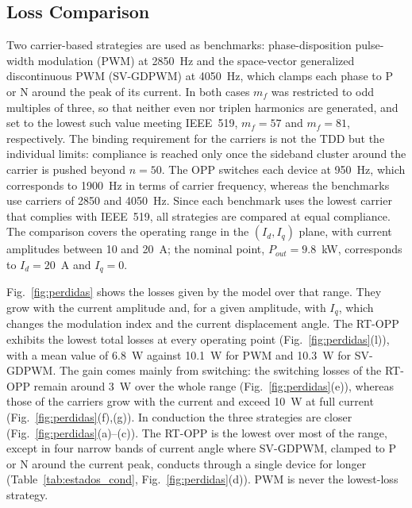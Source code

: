 \documentclass[conference]{IEEEtran}
\begin{document}
\subsection{Loss Comparison}

Two carrier-based strategies are used as benchmarks: phase-disposition
pulse-width modulation (PWM) at 2850~Hz and the space-vector generalized discontinuous PWM
(SV-GDPWM) \cite{hava_gdpwm} at 4050~Hz, which clamps each phase to P or N
around the peak of its current. In both cases $m_f$ was restricted to odd
multiples of three, so that neither even nor triplen harmonics are
generated, and set to the lowest such value meeting IEEE~519, $m_f = 57$
and $m_f = 81$, respectively. The binding requirement for the carriers is
not the TDD but the individual limits: compliance is reached only once the
sideband cluster around the carrier is pushed beyond $n = 50$. The OPP
switches each device at 950~Hz, which corresponds to 1900~Hz in terms of
carrier frequency, whereas the benchmarks use carriers of 2850 and
4050~Hz. Since each benchmark uses the lowest carrier that complies with
IEEE~519, all strategies are compared at equal compliance. The
comparison covers the operating range in the $(I_d,I_q)$ plane, with
current amplitudes between 10 and 20~A; the nominal point,
$P_{out} = 9.8$~kW, corresponds to $I_d = 20$~A and $I_q = 0$.

Fig.~\ref{fig:perdidas} shows the losses given by the model over that
range. They grow with the current amplitude and, for a given amplitude,
with $I_q$, which changes the modulation index and the current
displacement angle. The RT-OPP
exhibits the lowest total losses at every operating point
(Fig.~\ref{fig:perdidas}(l)), with a mean value of 6.8~W against 10.1~W for
PWM and 10.3~W for SV-GDPWM. The gain comes mainly from switching: the
switching losses of the RT-OPP remain around 3~W over the whole range
(Fig.~\ref{fig:perdidas}(e)), whereas those of the carriers grow with the
current and exceed 10~W at full current (Fig.~\ref{fig:perdidas}(f),(g)).
In conduction the three strategies are closer
(Fig.~\ref{fig:perdidas}(a)--(c)). The RT-OPP is the lowest over most of the
range, except in four narrow bands of current angle where SV-GDPWM, clamped
to P or N around the current peak, conducts through a single device for
longer (Table~\ref{tab:estados_cond}, Fig.~\ref{fig:perdidas}(d)). PWM is
never the lowest-loss strategy.
\end{document}
